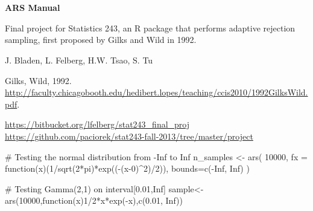 \documentclass[a4paper]{book}
\begin{document}
\chapter*{}
\begin{center}
{\textbf{\huge ARS Manual}}
\par\bigskip{\large \today}
\end{center}
%
\begin{Description}\relax
Final project for Statistics 243, an R package that performs adaptive rejection sampling, first proposed by Gilks and Wild in 1992.
\end{Description}
%
\begin{Details}\relax

\end{Details}
%
\begin{Author}\relax
J. Bladen, L. Felberg, H.W. Tsao, S. Tu
\end{Author}
%
\begin{References}\relax
Gilks, Wild, 1992. \url{http://faculty.chicagobooth.edu/hedibert.lopes/teaching/ccis2010/1992GilksWild.pdf}.
\end{References}
%
\begin{SeeAlso}\relax
\url{https://bitbucket.org/lfelberg/stat243_final_proj} \\{}
\url{https://github.com/paciorek/stat243-fall-2013/tree/master/project}
\end{SeeAlso}
%
\begin{Examples}
\begin{ExampleCode}
	# Testing the normal distribution from -Inf to Inf
	n_samples <- ars( 10000, fx = function(x){(1/sqrt(2*pi)*exp((-(x-0)^2)/2))}, bounds=c(-Inf, Inf) )

	# Testing Gamma(2,1) on interval[0.01,Inf]
	sample<-ars(10000,function(x){1/2*x*exp(-x)},c(0.01, Inf))
\end{ExampleCode}
\end{Examples}
\end{document}
